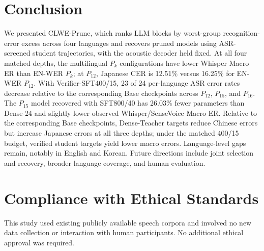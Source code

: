 \documentclass{article}
\begin{document}
\section{Conclusion}
\label{sec:conclusion}

We presented CLWE-Prune, which ranks LLM blocks by worst-group
recognition-error excess across four languages and recovers pruned
models using ASR-screened student trajectories, with the acoustic
decoder held fixed. At all four matched depths, the multilingual
\(P_k\) configurations have lower Whisper Macro ER than EN-WER
\(P_k\); at \(P_{12}\), Japanese CER is 12.51\% versus 16.25\% for
EN-WER \(P_{12}\). With Verifier-SFT400/15, 23 of 24 per-language
ASR error rates decrease relative to the corresponding Base checkpoints
across \(P_{12}\), \(P_{15}\), and \(P_{16}\). The \(P_{15}\) model
recovered with SFT800/40 has 26.03\% fewer parameters than Dense-24 and
slightly lower observed Whisper/SenseVoice Macro ER. Relative to
the corresponding Base checkpoints, Dense-Teacher targets reduce
Chinese errors but increase Japanese errors at all three depths;
under the matched 400/15 budget, verified student targets yield
lower macro errors. Language-level gaps remain, notably in English
and Korean. Future directions include joint selection and recovery,
broader language coverage, and human evaluation.

\section{Compliance with Ethical Standards}
This study used existing publicly available speech corpora and
involved no new data collection or interaction with human
participants. No additional ethical approval was required.







\begingroup\small
\setlength{\itemsep}{0pt}

\endgroup
\end{document}
